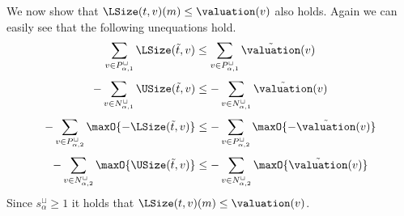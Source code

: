 We now show that $\LSize(t, v)(m) \leq \valuation(v)$ also holds.
Again we can easily see that the following unequations hold.
\[ \sum_{v \in P_{\alpha,1}^\sqcup} \LSize(\tilde{t}, v) \leq \sum_{v \in P_{\alpha,1}^\sqcup} \tilde{\valuation}(v) \]
\[ - \sum_{v \in N_{\alpha,1}^\sqcup} \USize(\tilde{t}, v) \leq - \sum_{v \in N_{\alpha,1}^\sqcup} \tilde{\valuation}(v) \]
\[ - \sum_{v \in P_{\alpha,2}^\sqcup} \maxO{-\LSize(\tilde{t}, v)} \leq - \sum_{v \in P_{\alpha,2}^\sqcup} \maxO{-\tilde{\valuation}(v)} \]
\[ - \sum_{v \in N_{\alpha,2}^\sqcup} \maxO{\USize(\tilde{t}, v)} \leq - \sum_{v \in N_{\alpha,2}^\sqcup} \maxO{\tilde{\valuation}(v)} \]
Since $s^\sqcup_\alpha \geq 1$ it holds that $\LSize(t, v)(m) \leq \valuation(v)$.
